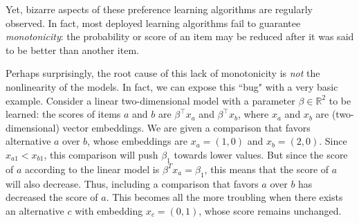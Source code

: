 \documentclass{article}
\newcommand{\setR}{\mathbb R}
\begin{document}
Yet, bizarre aspects of these preference learning algorithms are regularly observed.
In fact, most deployed learning algorithms fail to guarantee \emph{monotonicity}: the probability or score of an item may be reduced after it was said to be better than another item.

Perhaps surprisingly, 
the root cause of this lack of monotonicity is \emph{not} the nonlinearity of the models.
In fact, we can expose this ``bug" with a very basic example.
Consider a linear two-dimensional model with a parameter $\beta \in \setR^2$ to be learned: the scores of items $a$ and $b$ are $\beta^\top x_a$ and $\beta^\top x_b$, where $x_a$ and $x_b$ are (two-dimensional) vector embeddings.
We are given a comparison that favors alternative $a$ over $b$, whose embeddings are $x_a = (1, 0)$ and $x_b = (2, 0)$.
Since $x_{a1} < x_{b1}$, this comparison will push $\beta_1$ towards lower values.
But since the score of $a$ according to the linear model is $\beta^T x_a = \beta_1$,
this means that the score of $a$ will also decrease.
Thus, including a comparison that favors $a$ over $b$ has decreased the score of $a$.
This becomes all the more troubling when there exists an alternative $c$ with embedding $x_c = (0, 1)$, whose score remains unchanged.
\end{document}
